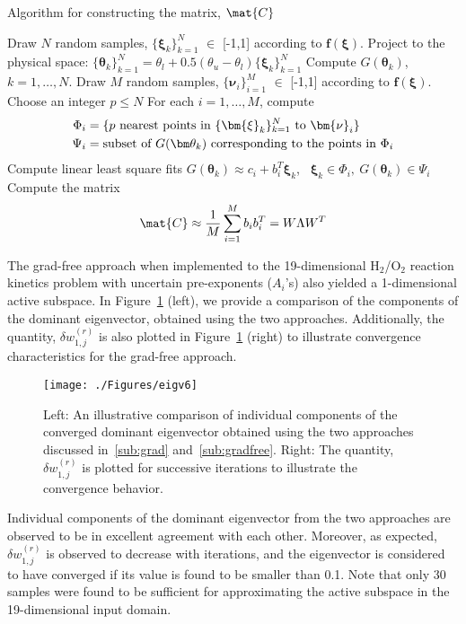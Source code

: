 \bigskip
\begin{breakablealgorithm}
  \caption{Algorithm for constructing the matrix, $\mat{C}$}
  \begin{algorithmic}[1]
	\State Draw $N$ random samples, $\{\bm{\xi}_k\}_{k=1}^{N}$ $\in$ [-1,1]
	according to $\bm{f(\xi)}$.
	\State Project to the physical space:
	$\{\bm{\theta}_k\}_{k=1}^{N}=\theta_l+0.5(\theta_u-\theta_l)\{\bm{\xi}_k\}_{k=1}^{N}$
	\State Compute $G(\bm\theta_k)$, $k=1, \ldots, N$.
	\State Draw $M$ random samples, $\{\bm{\nu}_i\}_{i=1}^{M}$ $\in$ [-1,1]
	according to $\bm{f(\xi)}$.
	\State Choose an integer $p \leq N$ 
	\State For each $i=1, \ldots, M$, compute 
	\[
	\begin{aligned}
	\Phi_i &= \{ p \text{ nearest points in } \{\bm{\xi}_k\}_{k=1}^{N} \text{ to } \bm{\nu}_i\}\\
	\vspace{-2mm}
	\Psi_i &= \text{subset of } G(\bm\theta_k) \text{ corresponding to the points in } \Phi_i
	\end{aligned}
	\]
	\State Compute linear least square fits 
	 $G(\bm\theta_k) \approx c_i + b_i^T\bm{\xi}_k$, \  $\bm{\xi}_k \in \Phi_i, \ G(\bm\theta_k) \in \Psi_i$
	\State Compute the matrix 
	\[
	\mat{C} \approx \frac{1}{M} \sum_{i=1}^{M} b_i b_i^T = {W}{\Lambda}{W}^T
	\]
	\EndProcedure
  \end{algorithmic}
  \label{alg:free2}
\end{breakablealgorithm}
\bigskip



The grad-free approach when implemented to the 19-dimensional H$_2$/O$_2$ reaction kinetics problem
with uncertain pre-exponents ($A_i$'s) also yielded a 1-dimensional active subspace. In Figure~\ref{fig:comp} (left),
we provide a comparison of the components of the dominant eigenvector, obtained using the two approaches.
Additionally, the quantity, $\delta w_{1,j}^{(r)}$ is also plotted in
Figure~\ref{fig:comp} (right) to illustrate convergence characteristics for the grad-free approach.
%
\begin{figure}[htbp]
 \begin{center}
  \texttt{[image: ./Figures/eigv6]}
\caption{Left: An illustrative comparison of individual components of the converged dominant eigenvector obtained
using the two approaches discussed in~\ref{sub:grad} and~\ref{sub:gradfree}. Right: The quantity,  $\delta w_{1,j}^{(r)}$
is plotted for successive iterations to illustrate the convergence behavior.}
\label{fig:comp}
\end{center}
\end{figure}
%
Individual components of the dominant eigenvector from the two approaches are observed to be in excellent
agreement with each other. Moreover, as expected,  $\delta w_{1,j}^{(r)}$ is observed to decrease with iterations, and
the eigenvector is considered to have converged if its value is found to be smaller than 0.1. Note that only 30 samples
were found to be sufficient for approximating the active subspace in the 19-dimensional input domain. 

